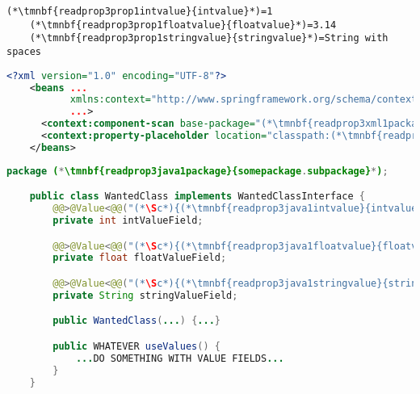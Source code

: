 \enlargethispage{20mm}
\thispagestyle{empty}
\example
\begin{lstlisting}[title={A \textit{properties} file called \tmnbf{readprop3prop1filename}{\textit{annotations.properties}}}]
    (*\tmnbf{readprop3prop1intvalue}{intvalue}*)=1
    (*\tmnbf{readprop3prop1floatvalue}{floatvalue}*)=3.14
    (*\tmnbf{readprop3prop1stringvalue}{stringvalue}*)=String with spaces
\end{lstlisting}
\begin{lstlisting}[language=XML, title={Configuration XML}]
    <?xml version="1.0" encoding="UTF-8"?>
    <beans ...
           xmlns:context="http://www.springframework.org/schema/context"
           ...>
      <context:component-scan base-package="(*\tmnbf{readprop3xml1package}{somepackage.subpackage}[ForestGreen]*)"/>
      <context:property-placeholder location="classpath:(*\tmnbf{readprop3xml1filename}{annotations.properties}[ForestGreen]*)" file-encoding="utf-8"/>
    </beans>
\end{lstlisting}
\begin{lstlisting}[language=Java, title={Wanted class with any constructor}]
    package (*\tmnbf{readprop3java1package}{somepackage.subpackage}*);

    public class WantedClass implements WantedClassInterface {
        @@>@Value<@@("(*\Sc*){(*\tmnbf{readprop3java1intvalue}{intvalue}[ForestGreen]*)}")
        private int intValueField;

        @@>@Value<@@("(*\Sc*){(*\tmnbf{readprop3java1floatvalue}{floatvalue}[ForestGreen]*)}")
        private float floatValueField;

        @@>@Value<@@("(*\Sc*){(*\tmnbf{readprop3java1stringvalue}{stringvalue}[ForestGreen]*)}")
        private String stringValueField;

        public WantedClass(...) {...}

        public WHATEVER useValues() {
            ...DO SOMETHING WITH VALUE FIELDS...
        }
    }
\end{lstlisting}
\newpage

